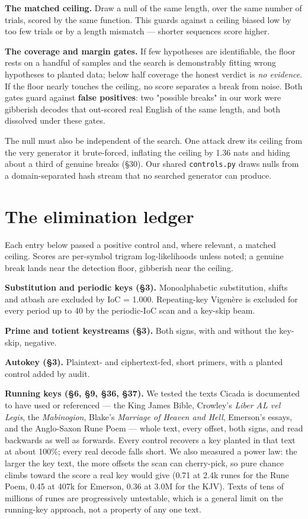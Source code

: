 \documentclass[11pt]{article}
\begin{document}
\textbf{The matched ceiling.} Draw a null of the same length, over the same number of trials, scored by the same function. This guards against a ceiling biased low by too few trials or by a length mismatch — shorter sequences score higher.


\textbf{The coverage and margin gates.} If few hypotheses are identifiable, the floor rests on a handful of samples and the search is demonstrably fitting wrong hypotheses to planted data; below half coverage the honest verdict is \emph{no evidence}. If the floor nearly touches the ceiling, no score separates a break from noise. Both gates guard against \textbf{false positives}: two "possible breaks" in our work were gibberish decodes that out-scored real English of the same length, and both dissolved under these gates.


The null must also be independent of the search. One attack drew its ceiling from the very generator it brute-forced, inflating the ceiling by 1.36 nats and hiding about a third of genuine breaks (§30). Our shared \texttt{controls.py} draws nulls from a domain-separated hash stream that no searched generator can produce.


\section{The elimination ledger}

Each entry below passed a positive control and, where relevant, a matched ceiling. Scores are per-symbol trigram log-likelihoods unless noted; a genuine break lands near the detection floor, gibberish near the ceiling.


\textbf{Substitution and periodic keys (§3).} Monoalphabetic substitution, shifts and atbash are excluded by IoC = 1.000. Repeating-key Vigenère is excluded for every period up to 40 by the periodic-IoC scan and a key-skip beam.


\textbf{Prime and totient keystreams (§3).} Both signs, with and without the key-skip, negative.


\textbf{Autokey (§3).} Plaintext- and ciphertext-fed, short primers, with a planted control added by audit.


\textbf{Running keys (§6, §9, §36, §37).} We tested the texts Cicada is documented to have used or referenced — the King James Bible, Crowley's \emph{Liber AL vel Legis}, the \emph{Mabinogion}, Blake's \emph{Marriage of Heaven and Hell}, Emerson's essays, and the Anglo-Saxon Rune Poem — whole text, every offset, both signs, and read backwards as well as forwards. Every control recovers a key planted in that text at about 100\%; every real decode falls short. We also measured a power law: the larger the key text, the more offsets the scan can cherry-pick, so pure chance climbs toward the score a real key would give (0.71 at 2.4k runes for the Rune Poem, 0.45 at 407k for Emerson, 0.36 at 3.0M for the KJV). Texts of tens of millions of runes are progressively untestable, which is a general limit on the running-key approach, not a property of any one text.
\end{document}
